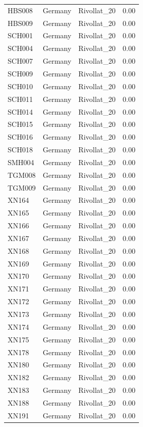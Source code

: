\begin{longtable}[t]{lllr}
HBS008 & Germany & Rivollat\_20 & 0.00\\
HBS009 & Germany & Rivollat\_20 & 0.00\\
SCH001 & Germany & Rivollat\_20 & 0.00\\
SCH004 & Germany & Rivollat\_20 & 0.00\\
SCH007 & Germany & Rivollat\_20 & 0.00\\
SCH009 & Germany & Rivollat\_20 & 0.00\\
SCH010 & Germany & Rivollat\_20 & 0.00\\
SCH011 & Germany & Rivollat\_20 & 0.00\\
SCH014 & Germany & Rivollat\_20 & 0.00\\
SCH015 & Germany & Rivollat\_20 & 0.00\\
SCH016 & Germany & Rivollat\_20 & 0.00\\
SCH018 & Germany & Rivollat\_20 & 0.00\\
SMH004 & Germany & Rivollat\_20 & 0.00\\
TGM008 & Germany & Rivollat\_20 & 0.00\\
TGM009 & Germany & Rivollat\_20 & 0.00\\
XN164 & Germany & Rivollat\_20 & 0.00\\
XN165 & Germany & Rivollat\_20 & 0.00\\
XN166 & Germany & Rivollat\_20 & 0.00\\
XN167 & Germany & Rivollat\_20 & 0.00\\
XN168 & Germany & Rivollat\_20 & 0.00\\
XN169 & Germany & Rivollat\_20 & 0.00\\
XN170 & Germany & Rivollat\_20 & 0.00\\
XN171 & Germany & Rivollat\_20 & 0.00\\
XN172 & Germany & Rivollat\_20 & 0.00\\
XN173 & Germany & Rivollat\_20 & 0.00\\
XN174 & Germany & Rivollat\_20 & 0.00\\
XN175 & Germany & Rivollat\_20 & 0.00\\
XN178 & Germany & Rivollat\_20 & 0.00\\
XN180 & Germany & Rivollat\_20 & 0.00\\
XN182 & Germany & Rivollat\_20 & 0.00\\
XN183 & Germany & Rivollat\_20 & 0.00\\
XN188 & Germany & Rivollat\_20 & 0.00\\
XN191 & Germany & Rivollat\_20 & 0.00\\

\end{longtable}
